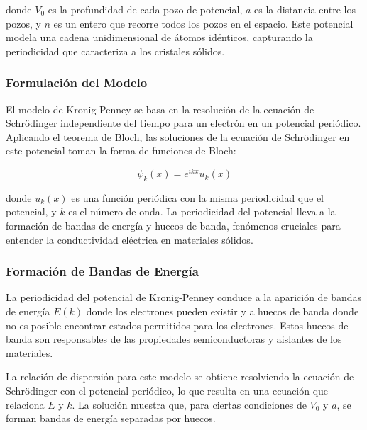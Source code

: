 \documentclass[a4paper,12pt]{article}
\begin{document}
donde \( V_0 \) es la profundidad de cada pozo de potencial, \( a \) es la distancia entre los pozos, y \( n \) es un entero que recorre todos los pozos en el espacio. Este potencial modela una cadena unidimensional de átomos idénticos, capturando la periodicidad que caracteriza a los cristales sólidos.

\subsubsection{Formulación del Modelo}

El modelo de Kronig-Penney se basa en la resolución de la ecuación de Schrödinger independiente del tiempo para un electrón en un potencial periódico. Aplicando el teorema de Bloch, las soluciones de la ecuación de Schrödinger en este potencial toman la forma de funciones de Bloch:

\begin{equation}
    \psi_k(x) = e^{ikx} u_k(x)
\end{equation}

donde \( u_k(x) \) es una función periódica con la misma periodicidad que el potencial, y \( k \) es el número de onda. La periodicidad del potencial lleva a la formación de bandas de energía y huecos de banda, fenómenos cruciales para entender la conductividad eléctrica en materiales sólidos.

\subsubsection{Formación de Bandas de Energía}

La periodicidad del potencial de Kronig-Penney conduce a la aparición de bandas de energía \( E(k) \) donde los electrones pueden existir y a huecos de banda donde no es posible encontrar estados permitidos para los electrones. Estos huecos de banda son responsables de las propiedades semiconductoras y aislantes de los materiales.

La relación de dispersión para este modelo se obtiene resolviendo la ecuación de Schrödinger con el potencial periódico, lo que resulta en una ecuación que relaciona \( E \) y \( k \). La solución muestra que, para ciertas condiciones de \( V_0 \) y \( a \), se forman bandas de energía separadas por huecos.
\end{document}

